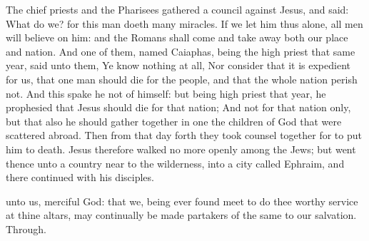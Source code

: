 
\vspace{-0.2\baselineskip}


\vspace{-0.1\baselineskip}

 The chief priests and the Pharisees gathered a council against Jesus, and said: What do we? for this man doeth many miracles. If we let him thus alone, all men will believe on him: and the Romans shall come and take away both our place and nation. And one of them, named Caiaphas, being the high priest that same year, said unto them, Ye know nothing at all, Nor consider that it is expedient for us, that one man should die for the people, and that the whole nation perish not. And this spake he not of himself: but being high priest that year, he prophesied that Jesus should die for that nation; And not for that nation only, but that also he should gather together in one the children of God that were scattered abroad. Then from that day forth they took counsel together for to put him to death. Jesus therefore walked no more openly among the Jews; but went thence unto a country near to the wilderness, into a city called Ephraim, and there continued with his disciples.


\vspace{-0.2\baselineskip}

\secret

\vspace{-0.1\baselineskip}

 unto us, merciful God: that we, being ever found meet to do thee worthy service at thine altars, may continually be made partakers of the same to our salvation. Through.

